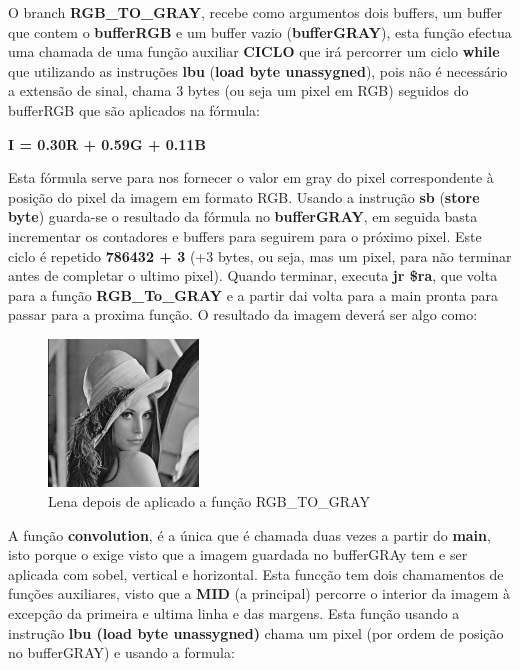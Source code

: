 \documentclass[a4paper,11pt]{article}
\begin{document}
\newline
\newline
\indent O branch {\bf RGB\_TO\_GRAY}, recebe como argumentos dois buffers, um buffer que contem o {\bf bufferRGB} e um buffer vazio ({\bf bufferGRAY}), esta função efectua uma chamada de uma função auxiliar {\bf CICLO} que irá percorrer um ciclo {\bf while} que utilizando as instruções {\bf lbu} ({\bf load byte unassygned}), pois não é necessário a extensão de sinal, chama 3 bytes (ou seja um pixel em RGB) seguidos do bufferRGB que são aplicados na fórmula:
\newline
\begin{center}
{\bf I = 0.30R + 0.59G + 0.11B}
\end{center}

Esta fórmula serve para nos fornecer o valor em gray do pixel correspondente à posição do pixel da imagem em formato RGB. Usando a instrução {\bf sb} ({\bf store byte}) guarda-se o resultado da fórmula no {\bf bufferGRAY}, em seguida basta incrementar os contadores e buffers para seguirem para o próximo pixel. Este ciclo é repetido {\bf 786432 + 3} (+3 bytes, ou seja, mas um pixel, para não terminar antes de completar o ultimo pixel). Quando terminar, executa {\bf jr \$ra}, que volta para a função {\bf RGB\_To\_GRAY} e a partir dai volta para a main pronta para passar para a proxima função.
\newline
O resultado da imagem deverá ser algo como:

\begin{figure}[ht!]
\centering
\includegraphics[width=40mm]{Lena(Gray)}
\caption{Lena depois de aplicado a função RGB\_TO\_GRAY}
\label{overflow}
\end{figure}

\newpage

\newline
\newline
\indent A função {\bf convolution}, é a única que é chamada duas vezes a partir do {\bf main}, isto porque o exige visto que a imagem guardada no bufferGRAy tem e ser aplicada com sobel, vertical e horizontal. Esta funcção tem dois chamamentos de funções auxiliares, visto que a {\bf MID} (a principal) percorre o interior da imagem à excepção da primeira e ultima linha e das margens. Esta função usando a instrução {\bf lbu (load byte unassygned)} chama um pixel (por ordem de posição no bufferGRAY) e usando a formula:
\end{document}
